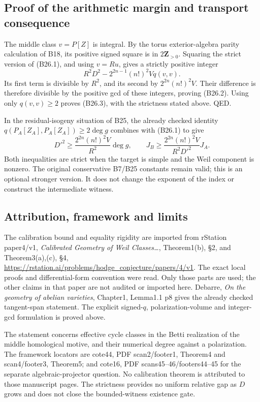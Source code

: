 \documentclass[11pt,a4paper]{article}
\theoremstyle{definition}
\begin{document}
\subsection{Proof of the arithmetic margin and transport consequence}\label{proof-of-the-arithmetic-margin-and-transport-consequence}

The middle class \(v=P[Z]\) is integral. By the torus exterior-algebra parity calculation of B18, its positive signed square is in \(2\mathbf Z_{>0}\). Squaring the strict version of (B26.1), and using \(v=Ru\), gives a strictly positive integer \[
 R^2D^2-2^{2n-1}(n!)^2Vq(v,v).
\] Its first term is divisible by \(R^2\), and its second by \(2^{2n}(n!)^2V\). Their difference is therefore divisible by the positive gcd of these integers, proving (B26.2). Using only \(q(v,v)\ge2\) proves (B26.3), with the strictness stated above. QED.

In the residual-isogeny situation of B25, the already checked identity \(q(P_A[Z_A],P_A[Z_A])\ge2\deg g\) combines with (B26.1) to give \[
 D'^2\ge\frac{2^{2n}(n!)^2V}{R^2}\deg g,
 \qquad
 J_B\ge\frac{2^{2n}(n!)^2V}{R^2D'^2}J_A.
 \tag{B26.7}
\] Both inequalities are strict when the target is simple and the Weil component is nonzero. The original conservative B7/B25 constants remain valid; this is an optional stronger version. It does not change the exponent of the index or construct the intermediate witness.

\subsection{Attribution, framework and limits}\label{attribution-framework-and-limits}

The calibration bound and equality rigidity are imported from rStation paper4/v1, \emph{Calibrated Geometry of Weil Classes\ldots{}}, Theorem1(b), §2, and Theorem3(a),(c), §4, \url{https://rstation.ai/problems/hodge_conjecture/papers/4/v1}. The exact local proofs and differential-form convention were read. Only those parts are used; the other claims in that paper are not audited or imported here. Debarre, \emph{On the geometry of abelian varieties}, Chapter1, Lemma1.1 p8 gives the already checked tangent-span statement. The explicit signed-\(q\), polarization-volume and integer-gcd formulation is proved above.

The statement concerns effective cycle classes in the Betti realization of the middle homological motive, and their numerical degree against a polarization. The framework locators are cote44, PDF scan2/footer1, Theorem4 and scan4/footer3, Theorem5; and cote16, PDF scans45--46/footers44--45 for the separate algebraic-projector question. No calibration theorem is attributed to those manuscript pages. The strictness provides no uniform relative gap as \(D\) grows and does not close the bounded-witness existence gate.
\end{document}
